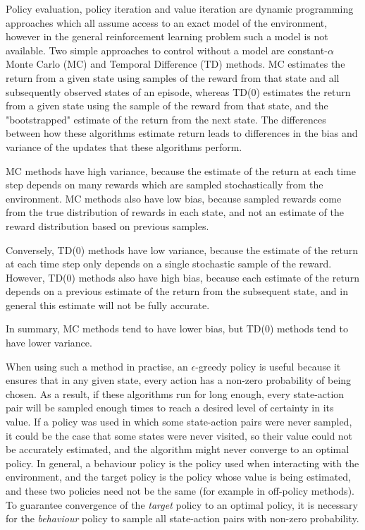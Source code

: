 Policy evaluation, policy iteration and value iteration are dynamic programming approaches which all assume access to an exact model of the environment, however in the general reinforcement learning problem such a model is not available. Two simple approaches to control without a model are constant-$\alpha$ Monte Carlo (MC) and Temporal Difference (TD) methods. MC estimates the return from a given state using samples of the reward from that state and all subsequently observed states of an episode, whereas TD(0) estimates the return from a given state using the sample of the reward from that state, and the "bootstrapped" estimate of the return from the next state. The differences between how these algorithms estimate return leads to differences in the bias and variance of the updates that these algorithms perform.

MC methods have high variance, because the estimate of the return at each time step depends on many rewards which are sampled stochastically from the environment. MC methods also have low bias, because sampled rewards come from the true distribution of rewards in each state, and not an estimate of the reward distribution based on previous samples.

Conversely, TD(0) methods have low variance, because the estimate of the return at each time step only depends on a single stochastic sample of the reward. However, TD(0) methods also have high bias, because each estimate of the return depends on a previous estimate of the return from the subsequent state, and in general this estimate will not be fully accurate.

In summary, MC methods tend to have lower bias, but TD(0) methods tend to have lower variance.

When using such a method in practise, an $\epsilon$-greedy policy is useful because it ensures that in any given state, every action has a non-zero probability of being chosen. As a result, if these algorithms run for long enough, every state-action pair will be sampled enough times to reach a desired level of certainty in its value. If a policy was used in which some state-action pairs were never sampled, it could be the case that some states were never visited, so their value could not be accurately estimated, and the algorithm might never converge to an optimal policy. In general, a behaviour policy is the policy used when interacting with the environment, and the target policy is the policy whose value is being estimated, and these two policies need not be the same (for example in off-policy methods). To guarantee convergence of the \emph{target} policy to an optimal policy, it is necessary for the \emph{behaviour} policy to sample all state-action pairs with non-zero probability.

